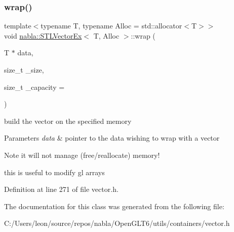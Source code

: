 \mbox{\label{classnabla_1_1_s_t_l_vector_ex_a5f3945f5d23d03285551521b69c961fc}} 
\subsubsection{\texorpdfstring{wrap()}{wrap()}}
{\footnotesize\ttfamily template$<$typename T, typename Alloc = std\+::allocator$<$\+T$>$$>$ \\
void \mbox{\hyperlink{classnabla_1_1_s_t_l_vector_ex}{nabla\+::\+S\+T\+L\+Vector\+Ex}}$<$ T, Alloc $>$\+::wrap (\begin{DoxyParamCaption}\item[{T $\ast$}]{data,  }\item[{size\+\_\+t}]{\+\_\+size,  }\item[{size\+\_\+t}]{\+\_\+capacity = {} }\end{DoxyParamCaption})\hspace{0.3cm}{\ttfamily [inline]}}

build the vector on the specified memory 
\begin{DoxyParams}{Parameters}
{\em data} & pointer to the data wishing to wrap with a vector \\
\hline
\end{DoxyParams}
\begin{DoxyNote}{Note}
it will not manage (free/reallocate) memory! 

this is useful to modify gl arrays 
\end{DoxyNote}


Definition at line 271 of file vector.\+h.



The documentation for this class was generated from the following file\+:\begin{DoxyCompactItemize}
\item 
C\+:/\+Users/leon/source/repos/nabla/\+Open\+G\+L\+T6/utils/containers/vector.\+h\end{DoxyCompactItemize}
